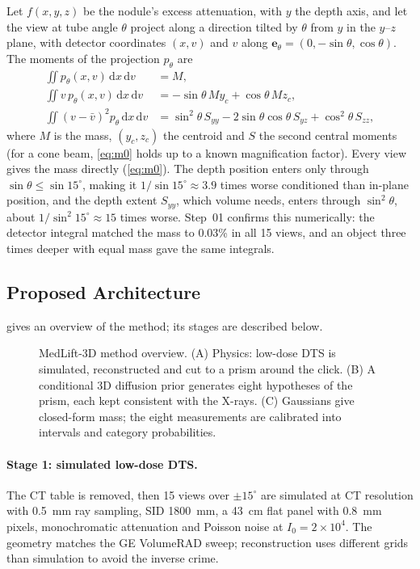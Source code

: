 Let $f(x,y,z)$ be the nodule's excess attenuation, with $y$ the depth axis, and let the view at tube angle $\theta$ project along a direction tilted by $\theta$ from $y$ in the $y$--$z$ plane, with detector coordinates $(x, v)$ and $v$ along $\mathbf{e}_\theta = (0, -\sin\theta, \cos\theta)$. The moments of the projection $p_\theta$ are
\begin{align}
  \iint p_\theta(x,v)\,\mathrm{d}x\,\mathrm{d}v &= M, \label{eq:m0}\\
  \iint v\, p_\theta(x,v)\,\mathrm{d}x\,\mathrm{d}v &= -\sin\theta\, M y_c + \cos\theta\, M z_c, \label{eq:m1}\\
  \iint (v-\bar v)^2 p_\theta\,\mathrm{d}x\,\mathrm{d}v &= \sin^2\theta\, S_{yy} - 2\sin\theta\cos\theta\, S_{yz} + \cos^2\theta\, S_{zz}, \label{eq:m2}
\end{align}
where $M$ is the mass, $(y_c,z_c)$ the centroid and $S$ the second central moments (for a cone beam, \cref{eq:m0} holds up to a known magnification factor). Every view gives the mass directly (\cref{eq:m0}). The depth position enters only through $\sin\theta \leq \sin 15^\circ$, making it $1/\sin15^\circ \approx 3.9$ times worse conditioned than in-plane position, and the depth extent $S_{yy}$, which volume needs, enters through $\sin^2\theta$, about $1/\sin^2 15^\circ \approx 15$ times worse. Step~01 confirms this numerically: the detector integral matched the mass to 0.03\% in all 15 views, and an object three times deeper with equal mass gave the same integrals.

\subsection{Proposed Architecture}

 gives an overview of the method; its stages are described below.

\begin{figure}[htbp]
  \centering
  \resizebox{\linewidth}{!}{}
  \caption[MedLift-3D method overview]{MedLift-3D method overview. (A) Physics: low-dose DTS is simulated, reconstructed and cut to a prism around the click. (B) A conditional 3D diffusion prior generates eight hypotheses of the prism, each kept consistent with the X-rays. (C) Gaussians give closed-form mass; the eight measurements are calibrated into intervals and category probabilities.}
  \label{fig:pipeline}
\end{figure}

\paragraph{Stage 1: simulated low-dose DTS.} The CT table is removed, then 15 views over $\pm15^\circ$ are simulated at CT resolution with 0.5~mm ray sampling, SID 1800~mm, a 43~cm flat panel with 0.8~mm pixels, monochromatic attenuation and Poisson noise at $I_0 = 2\times10^4$. The geometry matches the GE VolumeRAD sweep; reconstruction uses different grids than simulation to avoid the inverse crime.

